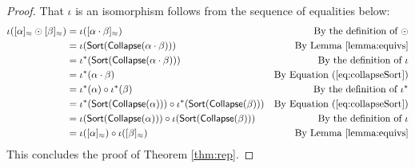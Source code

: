 \documentclass[twoside,11pt]{article}
\begin{document}
\begin{proof}
That $\iota$ is an isomorphism follows from the sequence of equalities below:
\begin{align*}
 \iota([\alpha]_{\approx} \odot [\beta]_{\approx}) & =  \iota([\alpha \cdot \beta]_{\approx}) & \text{By the definition of } \odot \\
  & =  \iota(\mathsf{Sort}(\mathsf{Collapse}(\alpha\cdot\beta))) & \text{By Lemma \ref{lemma:equivs}} \\
  & =  \iota^*(\mathsf{Sort}(\mathsf{Collapse}(\alpha\cdot\beta))) & \text{By the definition of } \iota \\
  & =  \iota^*(\alpha\cdot \beta) & \text{By Equation } (\ref{eq:collapseSort})\\
  & =  \iota^*(\alpha) \circ \iota^*(\beta) & \text{By the definition of } \iota^* \\
  & =  \iota^*(\mathsf{Sort}(\mathsf{Collapse}(\alpha))) \circ \iota^*(\mathsf{Sort}(\mathsf{Collapse}(\beta))) & \text{By Equation } (\ref{eq:collapseSort}) \\
  & =  \iota(\mathsf{Sort}(\mathsf{Collapse}(\alpha))) \circ \iota(\mathsf{Sort}(\mathsf{Collapse}(\beta))) & \text{By the definition of } \iota \\
  & =  \iota([\alpha]_{\approx}) \circ \iota([\beta]_{\approx}) & \text{By Lemma \ref{lemma:equivs}}
\end{align*} This concludes the proof of Theorem \ref{thm:rep}. \end{proof}
\end{document}
